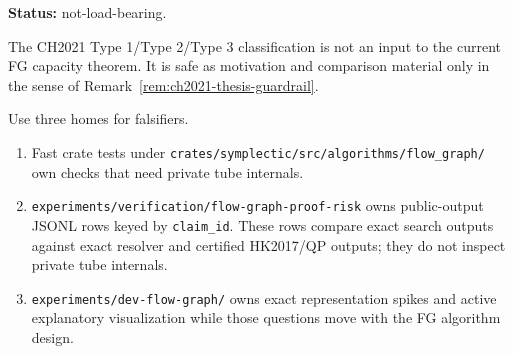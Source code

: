 \begin{remark}%
\label{rem:fg-pr-ch2021-not-load-bearing}
\textbf{Status:} not-load-bearing.

The CH2021 Type 1/Type 2/Type 3 classification is not an input to the current
FG capacity theorem.  It is safe as motivation and comparison material only in
the sense of Remark~\ref{rem:ch2021-thesis-guardrail}.
\end{remark}

\begin{remark}\label{rem:fg-pr-falsifier-routing}
Use three homes for falsifiers.
\begin{enumerate}
  \item Fast crate tests under
    \texttt{crates/symplectic/src/algorithms/flow\_graph/} own checks that need
    private tube internals.
  \item \texttt{experiments/verification/flow-graph-proof-risk} owns
    public-output JSONL rows keyed by \texttt{claim\_id}.  These rows compare
    exact search outputs against exact resolver and certified HK2017/QP outputs;
    they do not inspect private tube internals.
  \item \texttt{experiments/dev-flow-graph/} owns exact representation spikes
    and active explanatory visualization while those questions move with the FG
    algorithm design.
\end{enumerate}
\end{remark}

